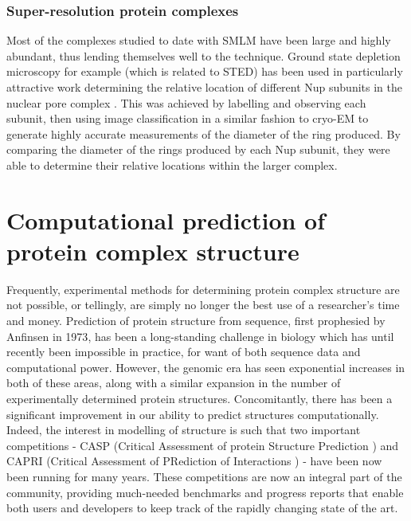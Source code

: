 \documentclass[a4paper,11pt,twoside,openright]{scrbook}
\begin{document}
\subsubsection{Super-resolution protein complexes}
Most of the complexes studied to date with SMLM have been large and highly abundant, thus lending themselves well to the technique. Ground state depletion microscopy for example (which is related to STED) has been used in particularly attractive work determining the relative location of different Nup subunits in the nuclear pore complex \cite{Szymborska2013}. This was achieved by labelling and observing each subunit, then using image classification in a similar fashion to cryo-EM to generate highly accurate measurements of the diameter of the ring produced. By comparing the diameter of the rings produced by each Nup subunit, they were able to determine their relative locations within the larger complex.



\section{Computational prediction of protein complex structure}
Frequently, experimental methods for determining protein complex structure are not possible, or tellingly, are simply no longer the best use of a researcher's time and money. Prediction of protein structure from sequence, first prophesied by Anfinsen in 1973\cite{Anfinsen1973}, has been a long-standing challenge in biology which has until recently been impossible in practice, for want of both sequence data and computational power. However, the genomic era has seen exponential increases in both of these areas, along with a similar expansion in the number of experimentally determined protein structures. Concomitantly, there has been a significant improvement in our ability to predict structures computationally. Indeed, the interest in modelling of structure is such that two important competitions - CASP (Critical Assessment of protein Structure Prediction \cite{Moult1995}) and CAPRI (Critical Assessment of PRediction of Interactions \cite{Janin2003}) - have been now been running for many years. These competitions are now an integral part of the community, providing much-needed benchmarks and progress reports that enable both users and developers to keep track of the rapidly changing state of the art.
\end{document}
